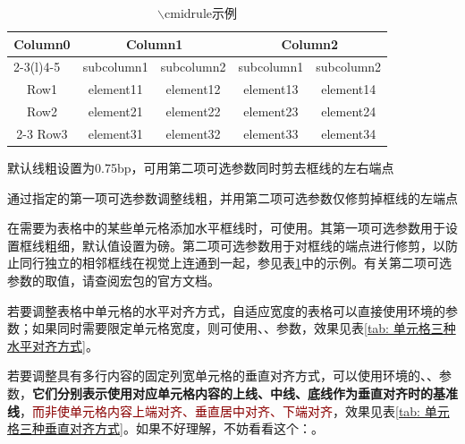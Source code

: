 \documentclass[QingNianC, vlined, timesmathnogreek]{nsfc}
\begin{document}
	\begin{table}[htp]
		\caption{$\backslash$cmidrule示例}\label{tab: cmidrule示例}
		\begin{threeparttable}
			\begin{tabular}{ccccc}
				\toprule
				\multirow{2}{*}{Column0} &  \multicolumn{2}{c}{Column1\tnote{1}} & \multicolumn{2}{c}{Column2\tnote{2}} \\
				\cmidrule(lr){2-3}\cmidrule[2.5bp](l){4-5}
				~     & subcolumn1 & subcolumn2 & subcolumn1 & subcolumn2 \\
				\midrule
				Row1  & element11 & element12 &element13 & element14 \\
				Row2  & element21 & element22 &element23 & element24 \\
				\cmidrule{2-3}\cmidrule[2.5bp]{4-5}
				Row3  & element31 & element32 &element33 & element34 \\
				\bottomrule
			\end{tabular}
			\begin{tablenotes}
				\item[1] 默认线粗设置为0.75bp，可用第二项可选参数同时剪去框线的左右端点
				\item[2] 通过指定的第一项可选参数调整线粗，并用第二项可选参数仅修剪掉框线的左端点
			\end{tablenotes}
		\end{threeparttable}
	\end{table}

	在需要为表格中的某些单元格添加水平框线时，可使用\newline{}。其第一项可选参数用于设置框线粗细，默认值设置为磅。第二项可选参数用于对框线的端点进行修剪，以防止同行独立的相邻框线在视觉上连通到一起，参见表\ref{tab: cmidrule示例}中的示例。有关第二项可选参数的取值，请查阅\href{https://mirrors.sustech.edu.cn/CTAN/macros/latex/contrib/booktabs/booktabs.pdf}{\ttfamily\color{DarkRed}}宏包的官方文档。
	
	若要调整表格中单元格的水平对齐方式，自适应宽度的表格可以直接使用环境的参数；如果同时需要限定单元格宽度，则可使用、、参数，效果见表\ref{tab: 单元格三种水平对齐方式}。


	若要调整具有多行内容的固定列宽单元格的垂直对齐方式，可以使用环境的、、参数，\textbf{它们分别表示使用对应单元格内容的上线、中线、底线作为垂直对齐时的基准线}，\textcolor{DarkRed}{而非使单元格内容上端对齐、垂直居中对齐、下端对齐}，效果见表\ref{tab: 单元格三种垂直对齐方式}。如果不好理解，不妨看看这个：\href{https://tex.stackexchange.com/questions/35293}{\ttfamily\color{DarkRed}}。
	
\end{document}
